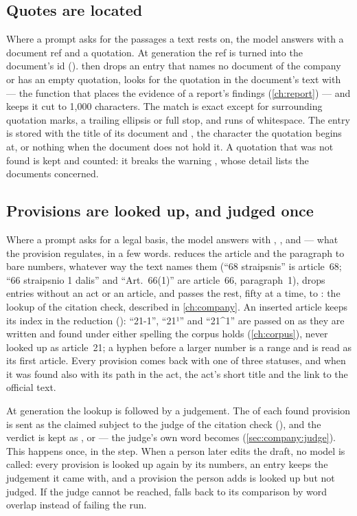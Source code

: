 \subsection{Quotes are located}

Where a prompt asks for the passages a text rests on, the model answers with a document ref
and a quotation. At generation the ref is turned into the document's id
().  then drops an entry that names no document of
the company or has an empty quotation, looks for the quotation in the document's text with
 --- the function that places the evidence of a report's findings
(\cref{ch:report}) --- and keeps it cut to 1,000 characters. The match is exact except for
surrounding quotation marks, a trailing ellipsis or full stop, and runs of whitespace. The entry is stored with the title of its document and
, the character the quotation begins at, or nothing when the document does not
hold it. A quotation that was not found is kept and counted: it breaks the warning
, whose detail lists the documents concerned.

\subsection{Provisions are looked up, and judged once}

Where a prompt asks for a legal basis, the model answers with , ,
 and  --- what the provision regulates, in a few words.
 reduces the article and the paragraph to bare numbers, whatever way
the text names them (\enquote{68 straipsnis} is article~68; \enquote{66 straipsnio 1 dalis}
and \enquote{Art.~66(1)} are article~66, paragraph~1), drops entries without an act or an
article, and passes the rest, fifty at a time, to : the lookup of the
citation check, described in \cref{ch:company}. An inserted article keeps its index in the
reduction (): \enquote{21-1}, \enquote{21¹} and \enquote{21\textasciicircum 1}
are passed on as they are written and found under either spelling the corpus holds
(\cref{ch:corpus}), never looked up as article~21; a hyphen before a larger number is a
range and is read as its first article. Every provision comes back with one of three
statuses, and when it was found also with its path in the act, the act's short title and the
link to the official text.

At generation the lookup is followed by a judgement. The  of each found provision is
sent as the claimed subject to the judge of the citation check
(), and the verdict is kept as , 
or  --- the judge's own word  becomes 
(\cref{sec:company:judge}). This happens once, in the  step. When a person later edits
the draft, no model is called: every provision is looked up again by its numbers, an entry
keeps the judgement it came with, and a provision the person adds is looked up but not judged.
If the judge cannot be reached,  falls back to its comparison by word
overlap instead of failing the run.


